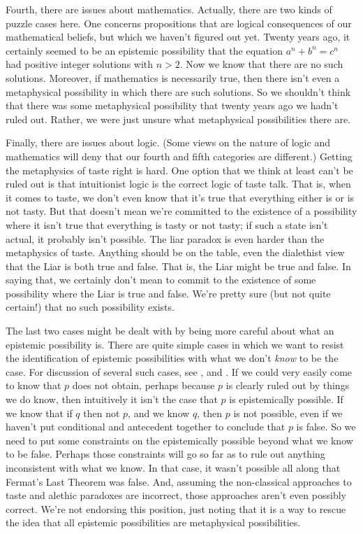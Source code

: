Fourth, there are issues about mathematics. Actually, there are two kinds of puzzle cases here. One concerns propositions that are logical consequences of our mathematical beliefs, but which we haven't figured out yet. Twenty years ago, it certainly seemed to be an epistemic possibility that the equation $a^n + b^n = c^n$ had positive integer solutions with $n > 2$. Now we know that there are no such solutions. Moreover, if mathematics is necessarily true, then there isn't even a metaphysical possibility in which there are such solutions. So we shouldn't think that there was some metaphysical possibility that twenty years ago we hadn't ruled out. Rather, we were just unsure what metaphysical possibilities there are.

Finally, there are issues about logic. (Some views on the nature of logic and mathematics will deny that our fourth and fifth categories are different.) Getting the metaphysics of taste right is hard. One option that we think at least can't be ruled out is that intuitionist logic is the correct logic of taste talk. That is, when it comes to taste, we don't even know that it's true that everything either is or is not tasty. But that doesn't mean we're committed to the existence of a possibility where it isn't true that everything is tasty or not tasty; if such a state isn't actual, it probably isn't possible. The liar paradox is even harder than the metaphysics of taste. Anything should be on the table, even the dialethist view that the Liar is both true and false. That is, the Liar might be true and false. In saying that, we certainly don't mean to commit to the existence of some possibility where the Liar is true and false. We're pretty sure (but not quite certain!) that no such possibility exists.

The last two cases might be dealt with by being more careful about what an epistemic possibility is. There are quite simple cases in which we want to resist the identification of epistemic possibilities with what we don't \textit{know} to be the case. For discussion of several such cases, see \citet{Hacking1967}, \citet{Teller1972} and \citet{DeRose1991}. If we could very easily come to know that $p$ does not obtain, perhaps because $p$ is clearly ruled out by things we do know, then intuitively it isn't the case that $p$ is epistemically possible. If we know that if $q$ then not $p$, and we know $q$, then $p$ is not possible, even if we haven't put conditional and antecedent together to conclude that $p$ is false. So we need to put some constraints on the epistemically possible beyond what we know to be false. Perhaps those constraints will go so far as to rule out anything inconsistent with what we know. In that case, it wasn't possible all along that Fermat's Last Theorem was false. And, assuming the non-classical approaches to taste and alethic paradoxes are incorrect, those approaches aren't even possibly correct. We're not endorsing this position, just noting that it is a way to rescue the idea that all epistemic possibilities are metaphysical possibilities.

